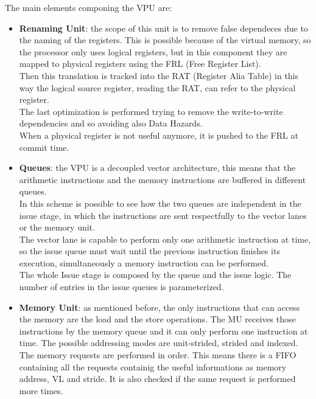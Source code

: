 The main elements componing the VPU are:
\begin{itemize}
    \item \textbf{Renaming Unit}: the scope of this unit is to remove false dependeces due to the naming of the registers. This is possible because of the virtual memory, so the processor only uses logical registers, but in this component they are mapped to physical registers using the FRL (Free Register List).\\
    Then this translation is tracked into the RAT (Register Alia Table) in this way the logical source register, reading the RAT, can refer to the physical register.\\
    The last optimization is performed trying to remove the write-to-write dependencies and so avoiding also Data Hazards.\\
    When a physical register is not useful anymore, it is pushed to the FRL at commit time.
 
    \item \textbf{Queues}: the VPU is a decoupled vector architecture, this means that the arithmetic instructions and the memory instructions are buffered in different queues.\\
    In this scheme is possible to see how the two queues are independent in the issue stage, in which the instructions are sent respectfully to the vector lanes or the memory unit.\\
    The vector lane is capable to perform only one arithmetic instruction at time, so the issue queue must wait until the previous instruction finishes its execution, simultaneously a memory instruction can be performed.\\
    The whole Issue stage is composed by the queue and the issue logic. The number of entries in the issue queues is parameterized.
    
    \item \textbf{Memory Unit}: as mentioned before, the only instructions that can access the memory are the load and the store operations. The MU receives those instructions by the memory queue and it can only perform one instruction at time. 
    The possible addressing modes are unit-strided, strided and indexed.\\
    
    The memory requests are performed in order. This means there is a FIFO containing all the requests containig the useful informations as memory address, VL and stride.
    It is also checked if the same request is performed more times.\\


\end{itemize}
